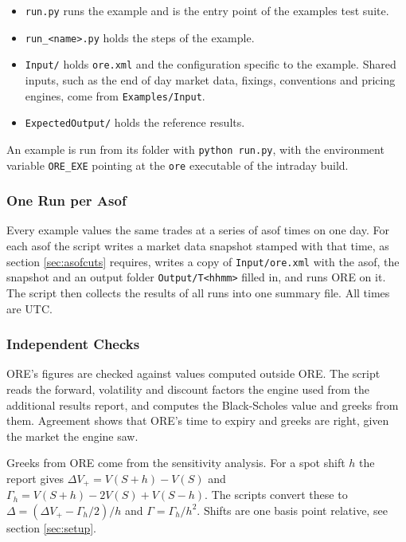 \documentclass[12pt, a4paper]{article}
\begin{document}
\begin{itemize}
\item \texttt{run.py} runs the example and is the entry point of the examples test suite.
\item \texttt{run\_<name>.py} holds the steps of the example.
\item \texttt{Input/} holds \texttt{ore.xml} and the configuration specific to the example. Shared inputs, such as
  the end of day market data, fixings, conventions and pricing engines, come from \texttt{Examples/Input}.
\item \texttt{ExpectedOutput/} holds the reference results.
\end{itemize}

An example is run from its folder with \texttt{python run.py}, with the environment variable \texttt{ORE\_EXE}
pointing at the \texttt{ore} executable of the intraday build.

\subsubsection*{One Run per Asof}

Every example values the same trades at a series of asof times on one day. For each asof the script writes a market
data snapshot stamped with that time, as section \ref{sec:asofcuts} requires, writes a copy of \texttt{Input/ore.xml}
with the asof, the snapshot and an output folder \texttt{Output/T<hhmm>} filled in, and runs ORE on it. The script
then collects the results of all runs into one summary file. All times are UTC.

\subsubsection*{Independent Checks}

ORE's figures are checked against values computed outside ORE. The script reads the forward, volatility and discount
factors the engine used from the additional results report, and computes the Black-Scholes value and greeks from them.
Agreement shows that ORE's time to expiry and greeks are right, given the market the engine saw.

Greeks from ORE come from the sensitivity analysis. For a spot shift $h$ the report gives
$\Delta V_+ = V(S+h) - V(S)$ and $\Gamma_h = V(S+h) - 2V(S) + V(S-h)$. The scripts convert these to
$\Delta = (\Delta V_+ - \Gamma_h/2)/h$ and $\Gamma = \Gamma_h/h^2$. Shifts are one basis point relative, see
section \ref{sec:setup}.
\end{document}
